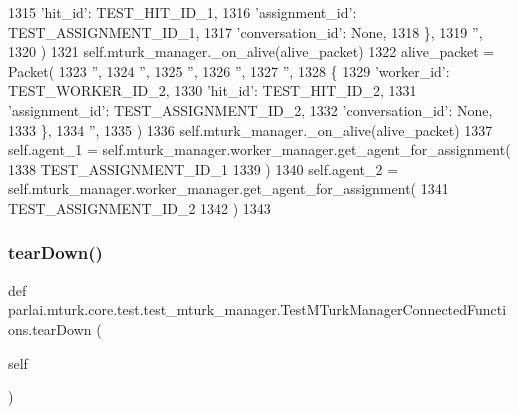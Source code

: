 \begin{DoxyCode}
1315                 \textcolor{stringliteral}{'hit\_id'}: TEST\_HIT\_ID\_1,
1316                 \textcolor{stringliteral}{'assignment\_id'}: TEST\_ASSIGNMENT\_ID\_1,
1317                 \textcolor{stringliteral}{'conversation\_id'}: \textcolor{keywordtype}{None},
1318             \},
1319             \textcolor{stringliteral}{''},
1320         )
1321         self.mturk\_manager.\_on\_alive(alive\_packet)
1322         alive\_packet = Packet(
1323             \textcolor{stringliteral}{''},
1324             \textcolor{stringliteral}{''},
1325             \textcolor{stringliteral}{''},
1326             \textcolor{stringliteral}{''},
1327             \textcolor{stringliteral}{''},
1328             \{
1329                 \textcolor{stringliteral}{'worker\_id'}: TEST\_WORKER\_ID\_2,
1330                 \textcolor{stringliteral}{'hit\_id'}: TEST\_HIT\_ID\_2,
1331                 \textcolor{stringliteral}{'assignment\_id'}: TEST\_ASSIGNMENT\_ID\_2,
1332                 \textcolor{stringliteral}{'conversation\_id'}: \textcolor{keywordtype}{None},
1333             \},
1334             \textcolor{stringliteral}{''},
1335         )
1336         self.mturk\_manager.\_on\_alive(alive\_packet)
1337         self.agent\_1 = self.mturk\_manager.worker\_manager.get\_agent\_for\_assignment(
1338             TEST\_ASSIGNMENT\_ID\_1
1339         )
1340         self.agent\_2 = self.mturk\_manager.worker\_manager.get\_agent\_for\_assignment(
1341             TEST\_ASSIGNMENT\_ID\_2
1342         )
1343 
\end{DoxyCode}
\mbox{\label{classparlai_1_1mturk_1_1core_1_1test_1_1test__mturk__manager_1_1TestMTurkManagerConnectedFunctions_a17e042745a95654d7088d2f6ad236af6}} 
\subsubsection{\texorpdfstring{tear\+Down()}{tearDown()}}
{\footnotesize\ttfamily def parlai.\+mturk.\+core.\+test.\+test\+\_\+mturk\+\_\+manager.\+Test\+M\+Turk\+Manager\+Connected\+Functions.\+tear\+Down (\begin{DoxyParamCaption}\item[{}]{self }\end{DoxyParamCaption})}



